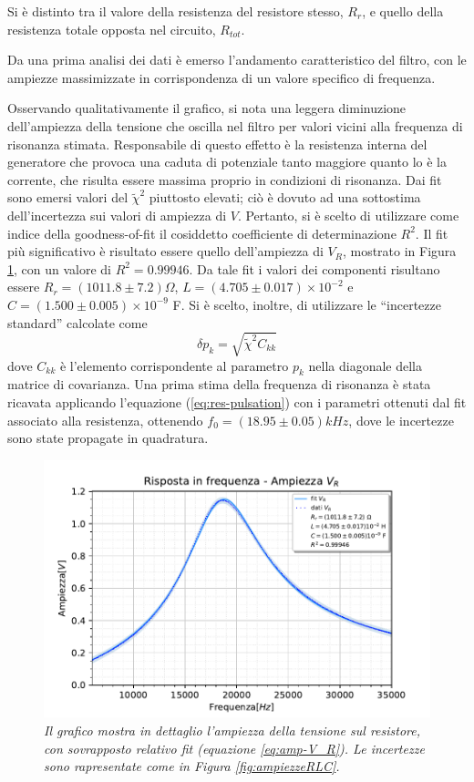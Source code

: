 \noindent Si è distinto tra il valore della resistenza del resistore stesso, $R_r$, e quello della resistenza totale
opposta nel circuito, $R_{tot}$.

Da una prima analisi dei dati è emerso l'andamento caratteristico del filtro, con le ampiezze massimizzate
in corrispondenza di un valore specifico di frequenza.

Osservando qualitativamente il grafico, si nota una leggera diminuzione dell’ampiezza della tensione che oscilla nel filtro
per valori vicini alla frequenza di risonanza stimata. Responsabile di questo effetto è la resistenza interna del generatore
che provoca una caduta di potenziale tanto maggiore quanto lo è la corrente, che risulta essere massima proprio in
condizioni di risonanza.
 Dai fit sono emersi valori del $\tilde{\chi}^2$ piuttosto elevati; ciò è dovuto ad una sottostima dell'incertezza sui
valori di ampiezza di $V$. Pertanto, si è scelto di utilizzare come indice della goodness-of-fit
il cosiddetto coefficiente di determinazione $R^2$.
Il fit più significativo è risultato essere quello dell'ampiezza di $V_R$, mostrato in Figura \ref{fig:ampiezzeR}, con
un valore di $R^2 = 0.99946$. Da tale fit i valori dei componenti risultano essere $R_r = (1011.8 \pm 7.2) \Omega$,
$L = (4.705 \pm 0.017) \times 10^{-2}$ e $C = (1.500 \pm 0.005)\times 10^{-9}$ F. Si è scelto, inoltre, di utilizzare le
``incertezze standard'' calcolate come
\[
    \delta p_k = \sqrt{\tilde{\chi}^2 C_{kk}}
\]
dove $C_{kk}$ è l'elemento corrispondente al parametro $p_k$ nella diagonale della matrice di covarianza.
Una prima stima della frequenza di risonanza è stata ricavata applicando l'equazione (\ref{eq:res-pulsation}) con i
parametri ottenuti dal fit associato alla resistenza, ottenendo $f_0 = (18.95 \pm 0.05) kHz$, dove le incertezze sono
state propagate in quadratura.
\begin{figure}[h]
    \centering
    \includegraphics[width=.77\textwidth]{../figs/Risposta-in-frequenza-ampiezza-resistenza.pdf}
    \caption{\emph{Il grafico mostra in dettaglio l'ampiezza della tensione sul resistore, con sovrapposto relativo fit
        (equazione \ref{eq:amp-V_R}). Le incertezze sono rapresentate come in Figura \ref{fig:ampiezzeRLC}.}}\label{fig:ampiezzeR}
\end{figure}

